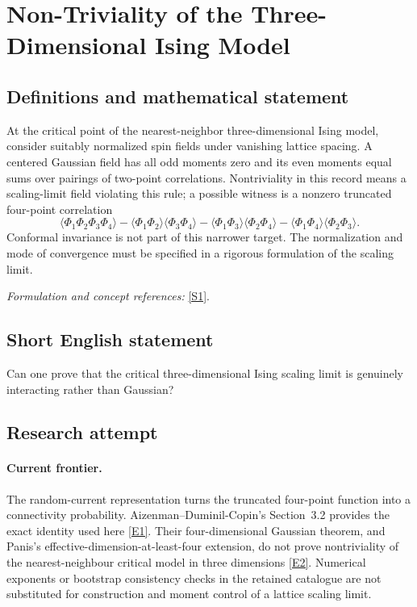 \documentclass[11pt,a4paper]{article}
\numberwithin{equation}{section}
\newcommand{\sref}[2]{\hyperlink{source:#1:#2}{[S#2]}}
\newcommand{\eref}[2]{\hyperlink{extra:#1:#2}{[E#2]}}
\newif\ifshowcatalogue
\newcommand{\cataloguescope}[1]{\ifshowcatalogue
 \paragraph{Exact scope in the supplied catalogue.}
 \begin{quote}\small #1\end{quote}\fi}
\begin{document}
\setcounter{section}{72}
\section{\texorpdfstring{Non-Triviality of the Three-Dimensional Ising Model}{Non-Triviality of the Three-Dimensional Ising Model}}\label{73}
\subsection{Definitions and mathematical statement}
At the critical point of the nearest-neighbor three-dimensional Ising model, consider suitably normalized spin fields under vanishing lattice spacing. A centered Gaussian field has all odd moments zero and its even moments equal sums over pairings of two-point correlations. Nontriviality in this record means a scaling-limit field violating this rule; a possible witness is a nonzero truncated four-point correlation
\[
 \langle\Phi_1\Phi_2\Phi_3\Phi_4\rangle
 -\langle\Phi_1\Phi_2\rangle\langle\Phi_3\Phi_4\rangle
 -\langle\Phi_1\Phi_3\rangle\langle\Phi_2\Phi_4\rangle
 -\langle\Phi_1\Phi_4\rangle\langle\Phi_2\Phi_3\rangle.
\]
Conformal invariance is not part of this narrower target. The normalization and mode of convergence must be specified in a rigorous formulation of the scaling limit.
\par\smallskip\textit{Formulation and concept references:} \sref{73}{1}.
\cataloguescope{Prove that the critical three-dimensional Ising model is non-trivial, that is, that its scaling limit is not Gaussian and its critical spin correlations do not factorize according to Wick's rule.}
\subsection{Short English statement}
Can one prove that the critical three-dimensional Ising scaling limit is genuinely interacting rather than Gaussian?
\subsection{Research attempt}

\paragraph{Current frontier.}
The random-current representation turns the truncated four-point function
into a connectivity probability. Aizenman--Duminil-Copin's Section~3.2
provides the exact identity used here \eref{73}{1}. Their four-dimensional
Gaussian theorem, and Panis's effective-dimension-at-least-four extension,
do not prove nontriviality of the nearest-neighbour critical model in
three dimensions \eref{73}{2}. Numerical exponents or bootstrap consistency
checks in the retained catalogue are not substituted for construction and
moment control of a lattice scaling limit.
\end{document}

